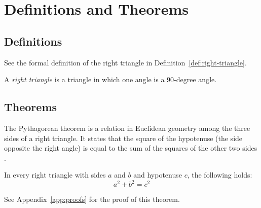 % 
\chapter{Definitions and Theorems}

\section{Definitions}

See the formal definition of the right triangle in Definition~\ref{def:right-triangle}.

\begin{definition}
\label{def:right-triangle}
A \emph{right triangle} is a triangle in which one angle is a 90-degree angle.
\end{definition}

\section{Theorems}
\label{sec:theorems}

The Pythagorean theorem is a relation in Euclidean geometry among the three sides of a right triangle. It states that the square of the hypotenuse (the side opposite the right angle) is equal to the sum of the squares of the other two sides \parencite{pythagoras}. 

\begin{theorem}
\label{thm:pythagoras}
In every right triangle with sides $a$ and $b$ and hypotenuse $c$, the following holds:
\begin{equation}
a^2 + b^2 = c^2
\end{equation}
\end{theorem}

See Appendix~\ref{app:proofs} for the proof of this theorem.
